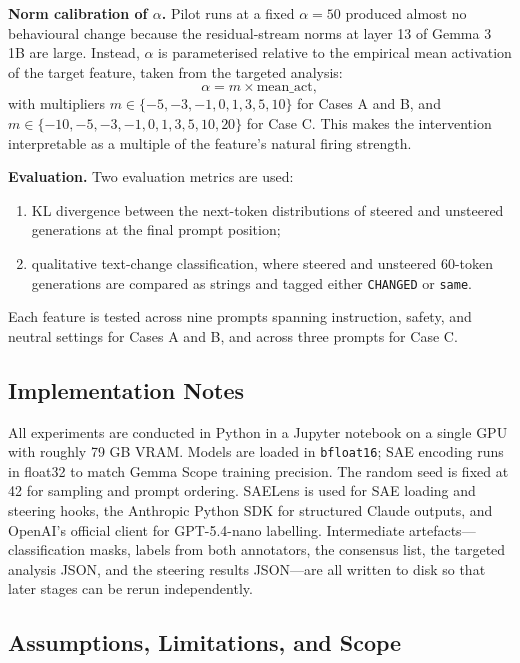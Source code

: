 \textbf{Norm calibration of $\alpha$.} Pilot runs at a fixed $\alpha = 50$ produced almost no behavioural change because the residual-stream norms at layer 13 of Gemma 3 1B are large. Instead, $\alpha$ is parameterised relative to the empirical mean activation of the target feature, taken from the targeted analysis:
\[
    \alpha = m \times \text{mean\_act},
\]
with multipliers $m \in \{-5, -3, -1, 0, 1, 3, 5, 10\}$ for Cases A and B, and $m \in \{-10, -5, -3, -1, 0, 1, 3, 5, 10, 20\}$ for Case C. This makes the intervention interpretable as a multiple of the feature's natural firing strength.

\textbf{Evaluation.} Two evaluation metrics are used:
\begin{enumerate}
    \item KL divergence between the next-token distributions of steered and unsteered generations at the final prompt position;
    \item qualitative text-change classification, where steered and unsteered 60-token generations are compared as strings and tagged either \texttt{CHANGED} or \texttt{same}.
\end{enumerate}
Each feature is tested across nine prompts spanning instruction, safety, and neutral settings for Cases A and B, and across three prompts for Case C.

\subsection{Implementation Notes}
\label{subsec:implementation-notes}

All experiments are conducted in Python in a Jupyter notebook on a single GPU with roughly 79 GB VRAM. Models are loaded in \texttt{bfloat16}; SAE encoding runs in float32 to match Gemma Scope training precision. The random seed is fixed at 42 for sampling and prompt ordering. SAELens is used for SAE loading and steering hooks, the Anthropic Python SDK for structured Claude outputs, and OpenAI's official client for GPT-5.4-nano labelling. Intermediate artefacts---classification masks, labels from both annotators, the consensus list, the targeted analysis JSON, and the steering results JSON---are all written to disk so that later stages can be rerun independently.

\subsection{Assumptions, Limitations, and Scope}
\label{subsec:assumptions-limitations}

